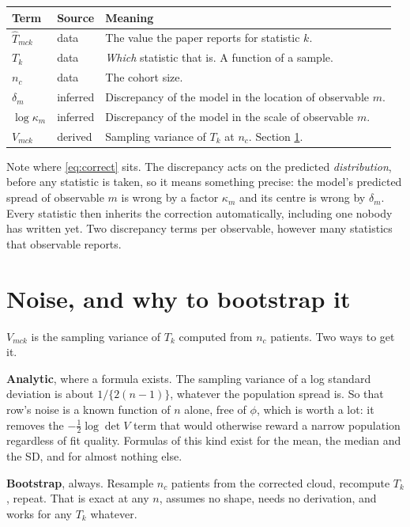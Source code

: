\documentclass[11pt]{article}
\begin{document}
\begin{center}\small
\begin{tabularx}{\textwidth}{@{}llX@{}}
\toprule
Term & Source & Meaning \\
\midrule
$\widehat T_{mck}$ & data & The value the paper reports for statistic $k$. \\
$T_k$ & data & \emph{Which} statistic that is. A function of a sample. \\
$n_c$ & data & The cohort size. \\
$\delta_m$ & inferred & Discrepancy of the model in the location of observable $m$. \\
$\log\kappa_m$ & inferred & Discrepancy of the model in the scale of observable $m$. \\
$V_{mck}$ & derived & Sampling variance of $T_k$ at $n_c$. Section \ref{sec:noise}. \\
\bottomrule
\end{tabularx}
\end{center}

Note where \eqref{eq:correct} sits. The discrepancy acts on the predicted
\emph{distribution}, before any statistic is taken, so it means something precise:
the model's predicted spread of observable $m$ is wrong by a factor $\kappa_m$
and its centre is wrong by $\delta_m$. Every statistic then inherits the
correction automatically, including one nobody has written yet. Two discrepancy
terms per observable, however many statistics that observable reports.

\section{Noise, and why to bootstrap it}
\label{sec:noise}

$V_{mck}$ is the sampling variance of $T_k$ computed from $n_c$ patients. Two
ways to get it.

\textbf{Analytic}, where a formula exists. The sampling variance of a log
standard deviation is about $1/\{2(n-1)\}$, whatever the population spread is. So
that row's noise is a known function of $n$ alone, free of $\phi$, which is worth
a lot: it removes the $-\tfrac12\log\det V$ term that would otherwise reward a
narrow population regardless of fit quality. Formulas of this kind exist for the
mean, the median and the SD, and for almost nothing else.

\textbf{Bootstrap}, always. Resample $n_c$ patients from the corrected cloud,
recompute $T_k$, repeat. That is exact at any $n$, assumes no shape, needs no
derivation, and works for any $T_k$ whatever.
\end{document}
